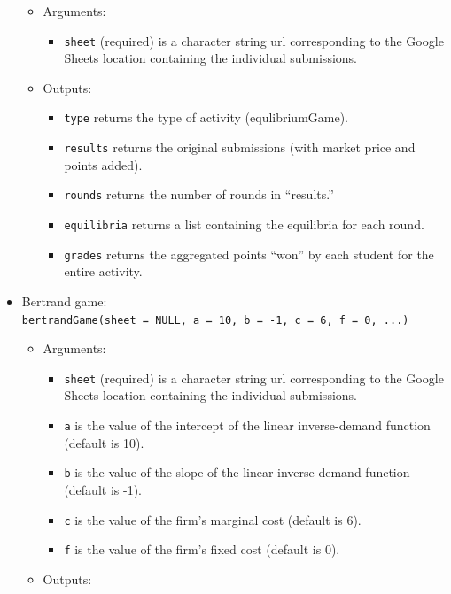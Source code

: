 \documentclass[
]{article}
\providecommand{\tightlist}{%
  \setlength{\itemsep}{0pt}\setlength{\parskip}{0pt}}
\begin{document}
\begin{itemize}
  \begin{itemize}
  \item
    Arguments:

    \begin{itemize}
    \tightlist
    \item
      \texttt{sheet} (required) is a character string url corresponding
      to the Google Sheets location containing the individual
      submissions.
    \end{itemize}
  \item
    Outputs:

    \begin{itemize}
    \tightlist
    \item
      \texttt{type} returns the type of activity (equlibriumGame).
    \item
      \texttt{results} returns the original submissions (with market
      price and points added).
    \item
      \texttt{rounds} returns the number of rounds in ``results.''
    \item
      \texttt{equilibria} returns a list containing the equilibria for
      each round.
    \item
      \texttt{grades} returns the aggregated points ``won'' by each
      student for the entire activity.
    \end{itemize}
  \end{itemize}
\item
  Bertrand game:
  \texttt{bertrandGame(sheet\ =\ NULL,\ a\ =\ 10,\ b\ =\ -1,\ c\ =\ 6,\ f\ =\ 0,\ ...)}

  \begin{itemize}
  \item
    Arguments:

    \begin{itemize}
    \tightlist
    \item
      \texttt{sheet} (required) is a character string url corresponding
      to the Google Sheets location containing the individual
      submissions.
    \item
      \texttt{a} is the value of the intercept of the linear
      inverse-demand function (default is 10).
    \item
      \texttt{b} is the value of the slope of the linear inverse-demand
      function (default is -1).
    \item
      \texttt{c} is the value of the firm's marginal cost (default is
      6).
    \item
      \texttt{f} is the value of the firm's fixed cost (default is 0).
    \end{itemize}
  \item
    Outputs:


\end{itemize}
\end{itemize}
\end{document}
